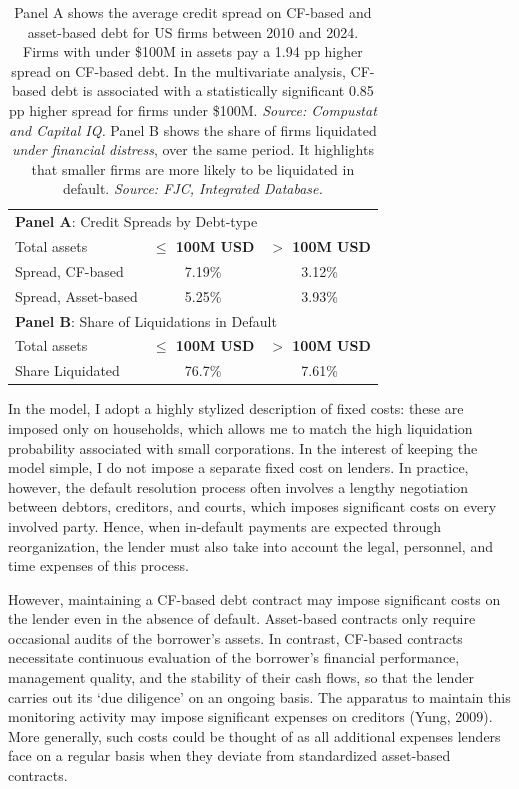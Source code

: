 \documentclass[12pt]{article}
\begin{document}
\begin{table}[H]
    \centering
    \begin{tabular}{lcc}
        
        \multicolumn{3}{l}{\textbf{Panel A}: Credit Spreads by Debt-type}\\
        Total assets & \textbf{$\leq$ 100M USD} & \textbf{$>$ 100M USD} \\
        \hline
        Spread, CF-based    & 7.19\% & 3.12\% \\
        Spread, Asset-based  & 5.25\% & 3.93\% \vspace{5mm} \\
        \multicolumn{3}{l}{\textbf{Panel B}: Share of Liquidations in Default} \\
        Total assets   & \textbf{$\leq$ 100M USD} & \textbf{$>$ 100M USD} \\
        \hline
        Share Liquidated  & 76.7\% & 7.61\% \\
           \end{tabular}
\caption{\small 
Panel A shows the average credit spread on CF-based and asset-based debt for US firms between 2010 and 2024. Firms with under \$100M in assets pay a 1.94 pp higher spread on CF-based debt. In the multivariate analysis, CF-based debt is associated with a statistically significant 0.85 pp higher spread for firms under \$100M. \textit{Source: Compustat and Capital IQ.}
Panel B shows the share of firms liquidated \textit{under financial distress}, over the same period. It highlights that smaller firms are more likely to be liquidated in default. \textit{Source: FJC, Integrated Database.}
}
    \label{tab:motivation}
\end{table}

In the model, I adopt a highly stylized description of fixed costs: these are imposed only on households, which allows me to match the high liquidation probability associated with small corporations. In the interest of keeping the model simple, I do not impose a separate fixed cost on lenders. In practice, however, the default resolution process often involves a lengthy negotiation between debtors, creditors, and courts, which imposes significant costs on every involved party. Hence, when in-default payments are expected through reorganization, the lender must also take into account the legal, personnel, and time expenses of this process. 

However, maintaining a CF-based debt contract may impose significant costs on the lender even in the absence of default. Asset-based contracts only require occasional audits of the borrower's assets. In contrast, CF-based contracts necessitate continuous evaluation of the borrower's financial performance, management quality, and the stability of their cash flows, so that the lender carries out its `due diligence' on an ongoing basis. The apparatus to maintain this monitoring activity may impose significant expenses on creditors (Yung, 2009). More generally, such costs could be thought of as all additional expenses lenders face on a regular basis when they deviate from standardized asset-based contracts.
\end{document}
